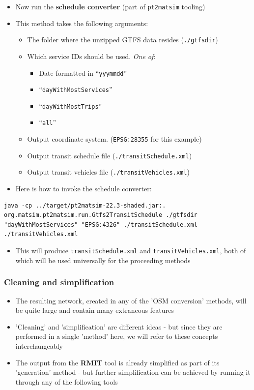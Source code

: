 \documentclass[11pt]{article}
\begin{document}
\begin{itemize}
\item Now run the \textbf{schedule converter} (part of \texttt{pt2matsim} tooling)
\item This method takes the following arguments:
\begin{itemize}
\item The folder where the unzipped GTFS data resides (\texttt{./gtfsdir})
\item Which service IDs should be used. \emph{One of}:
\begin{itemize}
\item Date formatted in ``\texttt{yyymmdd}''
\item ``\texttt{dayWithMostServices}''
\item ``\texttt{dayWithMostTrips}''
\item ``\texttt{all}''
\end{itemize}
\item Output coordinate system. (\texttt{EPSG:28355} for this example)
\item Output transit schedule file (\texttt{./transitSchedule.xml})
\item Output transit vehicles file (\texttt{./transitVehicles.xml})
\end{itemize}
\item Here is how to invoke the schedule converter:
\end{itemize}
\begin{verbatim}
java -cp ../target/pt2matsim-22.3-shaded.jar:. org.matsim.pt2matsim.run.Gtfs2TransitSchedule ./gtfsdir "dayWithMostServices" "EPSG:4326" ./transitSchedule.xml ./transitVehicles.xml
\end{verbatim}

\begin{itemize}
\item This will produce \texttt{transitSchedule.xml} and \texttt{transitVehicles.xml}, both of which will be used universally for the proceeding methods
\end{itemize}
\subsubsection{Cleaning and simplification}
\label{sec:org7a3d14c}
\begin{itemize}
\item The resulting network, created in any of the 'OSM conversion' methods, will be quite large and contain many extraneous features
\item 'Cleaning' and 'simplification' are different ideas - but since they are performed in a single 'method' here, we will refer to these concepts interchangeably
\item The output from the \textbf{RMIT} tool is already simplified as part of its 'generation' method - but further simplification can be achieved by running it through any of the following tools
\end{itemize}
\end{document}
